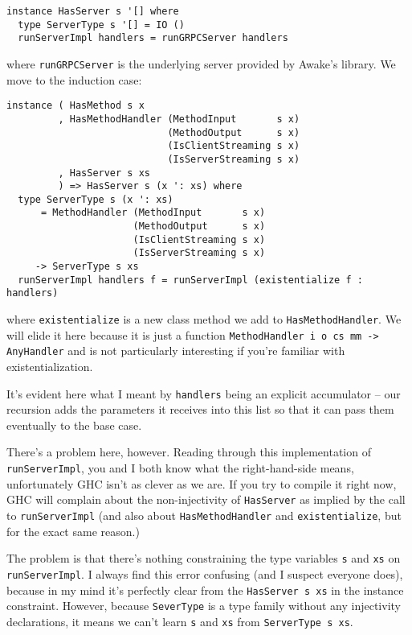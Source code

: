 \begin{verbatim}
instance HasServer s '[] where
  type ServerType s '[] = IO ()
  runServerImpl handlers = runGRPCServer handlers
\end{verbatim}{
where \texttt{runGRPCServer} is the underlying server provided by Awake's library.
We move to the induction case:

\begin{verbatim}
instance ( HasMethod s x
         , HasMethodHandler (MethodInput       s x)
                            (MethodOutput      s x)
                            (IsClientStreaming s x)
                            (IsServerStreaming s x)
         , HasServer s xs
         ) => HasServer s (x ': xs) where
  type ServerType s (x ': xs)
      = MethodHandler (MethodInput       s x)
                      (MethodOutput      s x)
                      (IsClientStreaming s x)
                      (IsServerStreaming s x)
     -> ServerType s xs
  runServerImpl handlers f = runServerImpl (existentialize f : handlers)
\end{verbatim}
where \texttt{existentialize} is a new class method we add to \texttt{HasMethodHandler}. We will elide it here because it is just a function \texttt{MethodHandler i o cs mm -> AnyHandler} and is not particularly interesting if you're familiar with existentialization.

It's evident here what I meant by \texttt{handlers} being an explicit accumulator -- our recursion adds the parameters it receives into this list so that it can pass them eventually to the base case.

There's a problem here, however. Reading through this implementation of \texttt{run\-Server\-Impl}, you and I both know what the right-hand-side means, unfortunately GHC isn't as clever as we are. If you try to compile it right now, GHC will complain about the non-injectivity of \texttt{HasServer} as implied by the call to \texttt{runServerImpl} (and also about \texttt{HasMethodHandler} and \texttt{existentialize}, but for the exact same reason.)

The problem is that there's nothing constraining the type variables \texttt{s} and \texttt{xs} on \texttt{runServerImpl}. I always find this error confusing (and I suspect everyone does), because in my mind it's perfectly clear from the \texttt{HasServer s xs} in the instance constraint. However, because \texttt{SeverType} is a type family without any injectivity declarations, it means we can't learn \texttt{s} and \texttt{xs} from \texttt{ServerType s xs}.

}
